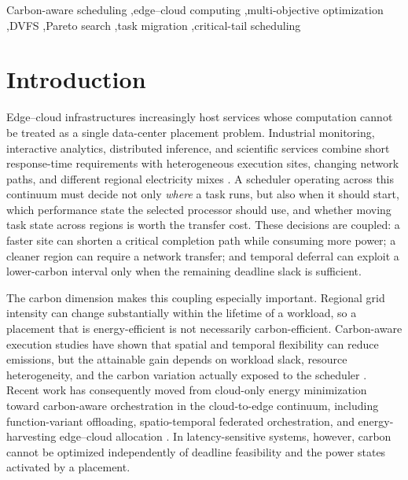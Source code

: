 \documentclass[preprint,12pt]{elsarticle}
\begin{document}
\begin{frontmatter}
\begin{keyword}
Carbon-aware scheduling \sep edge--cloud computing \sep multi-objective optimization \sep DVFS \sep Pareto search \sep task migration \sep critical-tail scheduling
\end{keyword}

\end{frontmatter}

\section{Introduction}
\label{sec:introduction}

Edge--cloud infrastructures increasingly host services whose computation cannot be treated as a single data-center placement problem. Industrial monitoring, interactive analytics, distributed inference, and scientific services combine short response-time requirements with heterogeneous execution sites, changing network paths, and different regional electricity mixes \cite{rahmani2025optimizing,pournazari2025computation,Etheredge2026Pulse}. A scheduler operating across this continuum must decide not only \emph{where} a task runs, but also when it should start, which performance state the selected processor should use, and whether moving task state across regions is worth the transfer cost. These decisions are coupled: a faster site can shorten a critical completion path while consuming more power; a cleaner region can require a network transfer; and temporal deferral can exploit a lower-carbon interval only when the remaining deadline slack is sufficient.

The carbon dimension makes this coupling especially important. Regional grid intensity can change substantially within the lifetime of a workload, so a placement that is energy-efficient is not necessarily carbon-efficient. Carbon-aware execution studies have shown that spatial and temporal flexibility can reduce emissions, but the attainable gain depends on workload slack, resource heterogeneity, and the carbon variation actually exposed to the scheduler \cite{West2026CarbonAwareWorkflows,son2025greenscale,zhai2025forecast}. Recent work has consequently moved from cloud-only energy minimization toward carbon-aware orchestration in the cloud-to-edge continuum, including function-variant offloading, spatio-temporal federated orchestration, and energy-harvesting edge--cloud allocation \cite{calavaro2026functionvariants,alshammaa2026federated,fu2026ehcarbon}. In latency-sensitive systems, however, carbon cannot be optimized independently of deadline feasibility and the power states activated by a placement.
\end{document}

